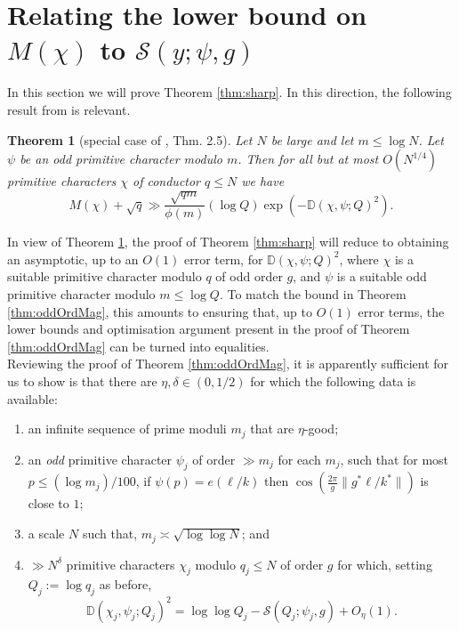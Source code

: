 \documentclass[10pt]{amsart}
\newtheorem{thm}{Theorem}[section]
\theoremstyle{definition}
\newcommand{\mc}{\mathcal}
\newcommand{\mb}{\mathbb}
\begin{document}
\section{Relating the lower bound on $M(\chi)$ to $\mc{S}(y;\psi,g)$}
In this section we will prove Theorem \ref{thm:sharp}. In this direction, the following result from \cite{LamMan} is relevant.
\begin{thm}[special case of \cite{LamMan}, Thm. 2.5] \label{thm:LMLow}
Let $N$ be large and let $m \leq \log N$.
Let $\psi$ be an odd primitive character modulo $m$. Then for all but at most $O(N^{1/4})$ primitive characters $\chi$ of conductor $q \leq N$ we have
\begin{equation}\label{eq:lowBdMChi}
M(\chi) + \sqrt{q} \gg \frac{\sqrt{qm}}{\phi(m)} (\log Q) \exp(-\mb{D}(\chi,\psi;Q)^2).
\end{equation}
\end{thm}
In view of Theorem \ref{thm:LMLow}, the proof of Theorem \ref{thm:sharp} will reduce to obtaining an asymptotic, up to an $O(1)$ error term, for $\mb{D}(\chi,\psi;Q)^2$, where $\chi$ is a suitable primitive character modulo $q$ of odd order $g$, and $\psi$ is a suitable odd primitive character modulo $m \leq \log Q$. To match the bound in Theorem \ref{thm:oddOrdMag}, this amounts to ensuring that, up to $O(1)$ error terms, the lower bounds and optimisation argument present in the proof of Theorem \ref{thm:oddOrdMag} can be turned into equalities. \\
Reviewing the proof of Theorem \ref{thm:oddOrdMag}, it is apparently sufficient for us to show is that there are $\eta,\delta \in (0,1/2)$ for which the following data is available: 
\begin{enumerate}
\item an infinite sequence of prime moduli $m_j$ that are $\eta$-good;
\item an \emph{odd} primitive character $\psi_j$ of order $\gg m_j$ for each $m_j$, such that for most $p \leq (\log m_j)/100$, if $\psi(p) = e(\ell/k)$ then $\cos(\tfrac{2\pi}{g}\|g^\ast \ell/k^\ast\|)$ is close to $1$;
\item a scale $N$ such that, $m_j \asymp \sqrt{\log\log N}$; and
\item $\gg N^{\delta}$ primitive characters $\chi_j$ modulo $q_j \leq N$ of order $g$ for which, setting $Q_j := \log q_j$ as before,
$$
\mb{D}(\chi_j,\psi_j;Q_j)^2 = \log\log Q_j - \mc{S}(Q_j;\psi_j,g) + O_{\eta}(1).
$$
\end{enumerate}
\end{document}
